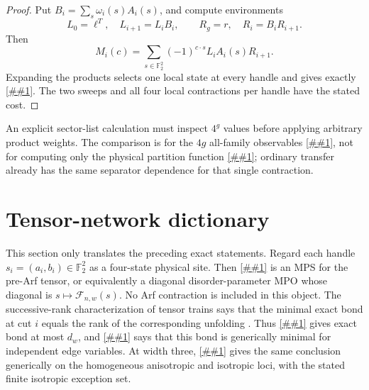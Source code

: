 \documentclass[11pt]{article}
\newcommand{\cref}[1]{\autoref{##1}}%
\newcommand{\Ftwo}{\mathbb F_2}
\newcommand{\cF}{\mathcal F}
\begin{document}
\begin{proof}
Put
\(B_i=\sum_s\omega_i(s)A_i(s)\), and compute environments
\[
 L_0=\ell^T,\quad L_{i+1}=L_iB_i,
 \qquad
 R_g=r,\quad R_i=B_iR_{i+1}.
\]
Then
\begin{equation}\label{eq:marginal-contract}
 M_i(c)=\sum_{s\in\Ftwo^2}(-1)^{c\cdot s}
        L_iA_i(s)R_{i+1}.
\end{equation}
Expanding the products selects one local state at every handle and gives
exactly \cref{eq:marginal}.  The two sweeps and all four local contractions
per handle have the stated cost.
\end{proof}

An explicit sector-list calculation must inspect \(4^g\) values before
applying arbitrary product weights.  The comparison is for the \(4g\)
all-family observables \cref{eq:marginal}, not for computing only the physical
partition function \cref{eq:arf}; ordinary transfer already has the same
separator dependence for that single contraction.

\section{Tensor-network dictionary}

This section only translates the preceding exact statements.  Regard each
handle \(s_i=(a_i,b_i)\in\Ftwo^2\) as a four-state physical site.  Then
\cref{eq:allq-mps} is an MPS for the pre-Arf tensor, or equivalently a
diagonal disorder-parameter MPO whose diagonal is
\(s\mapsto\cF_{n,w}(s)\).  No Arf contraction is included in this object.
The successive-rank characterization of tensor trains says that the minimal
exact bond at cut \(i\) equals the rank of the corresponding unfolding
\cite[Theorem~2.1]{Oseledets2011}.  Thus \cref{thm:grid-upper} gives exact bond
at most \(d_w\), and \cref{thm:grid-tight} says that this bond is generically
minimal for independent edge variables.  At width three,
\cref{thm:w3-homogeneous} gives the same conclusion generically on the
homogeneous anisotropic and isotropic loci, with the stated finite isotropic
exception set.
\end{document}
